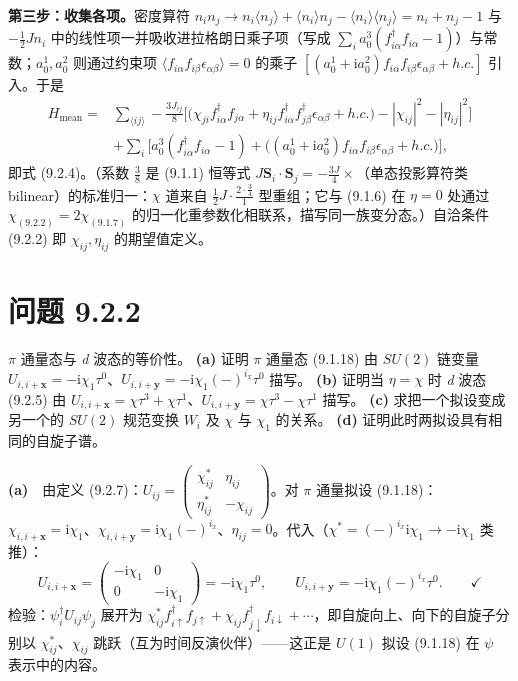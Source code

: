 \textbf{第三步：收集各项。}密度算符 $n_in_j\to n_i\langle n_j\rangle+\langle n_i\rangle n_j-\langle n_i\rangle\langle n_j\rangle=n_i+n_j-1$ 与 $-\frac12Jn_i$ 中的线性项一并吸收进拉格朗日乘子项（写成 $\sum_i a^3_0(f^{\dagger}_{i\alpha}f_{i\alpha}-1)$）与常数；$a^1_0,a^2_0$ 则通过约束项 $\langle f_{i\alpha}f_{i\beta}\epsilon_{\alpha\beta}\rangle=0$ 的乘子 $[(a^1_0+\mathrm{i}a^2_0)f_{i\alpha}f_{i\beta}\epsilon_{\alpha\beta}+h.c.]$ 引入。于是
\begin{align*}
H_{\text{mean}}={}&\sum_{\langle ij\rangle}-\frac{3J_{ij}}{8}\Big[\big(\chi_{ji}f^{\dagger}_{i\alpha}f_{j\alpha}+\eta_{ij}f^{\dagger}_{i\alpha}f^{\dagger}_{j\beta}\epsilon_{\alpha\beta}+h.c.\big)-|\chi_{ij}|^{2}-|\eta_{ij}|^{2}\Big]\\
&+\sum_i\Big[a^3_0(f^{\dagger}_{i\alpha}f_{i\alpha}-1)+\big((a^1_0+\mathrm{i}a^2_0)f_{i\alpha}f_{i\beta}\epsilon_{\alpha\beta}+h.c.\big)\Big] ,
\end{align*}
即式 (9.2.4)。（系数 $\frac38$ 是 (9.1.1) 恒等式 $J\pmb{S}_i\cdot\pmb{S}_j=-\frac{3J}{4}\times$（单态投影算符类 bilinear）的标准归一：$\chi$ 道来自 $\frac12J\cdot\frac{2\cdot\frac34}{1}$ 型重组；它与 (9.1.6) 在 $\eta=0$ 处通过 $\chi_{(9.2.2)}=2\chi_{(9.1.7)}$ 的归一化重参数化相联系，描写同一族变分态。）自洽条件 (9.2.2) 即 $\chi_{ij},\eta_{ij}$ 的期望值定义。

\section*{问题 9.2.2}
\begin{problem}
$\pi$ 通量态与 \emph{d} 波态的等价性。
\textbf{(a)} 证明 $\pi$ 通量态 (9.1.18) 由 $SU(2)$ 链变量 $U_{i,i+\pmb{x}}=-\mathrm{i}\chi_1\tau^0$、$U_{i,i+\pmb{y}}=-\mathrm{i}\chi_1(-)^{i_x}\tau^0$ 描写。
\textbf{(b)} 证明当 $\eta=\chi$ 时 \emph{d} 波态 (9.2.5) 由 $U_{i,i+\pmb{x}}=\chi\tau^3+\chi\tau^1$、$U_{i,i+\pmb{y}}=\chi\tau^3-\chi\tau^1$ 描写。
\textbf{(c)} 求把一个拟设变成另一个的 $SU(2)$ 规范变换 $W_i$ 及 $\chi$ 与 $\chi_1$ 的关系。
\textbf{(d)} 证明此时两拟设具有相同的自旋子谱。
\end{problem}
\solution
\textbf{(a)}　由定义 (9.2.7)：$U_{ij}=\begin{pmatrix}\chi^*_{ij}&\eta_{ij}\\ \eta^*_{ij}&-\chi_{ij}\end{pmatrix}$。对 $\pi$ 通量拟设 (9.1.18)：$\chi_{i,i+\pmb{x}}=\mathrm{i}\chi_1$、$\chi_{i,i+\pmb{y}}=\mathrm{i}\chi_1(-)^{i_x}$、$\eta_{ij}=0$。代入（$\chi^*=(-)^{i_x}\mathrm{i}\chi_1\to-\mathrm{i}\chi_1$ 类推）：
\begin{equation*}
U_{i,i+\pmb{x}}=\begin{pmatrix}-\mathrm{i}\chi_1&0\\0&-\mathrm{i}\chi_1\end{pmatrix}=-\mathrm{i}\chi_1\tau^{0},\qquad
U_{i,i+\pmb{y}}=-\mathrm{i}\chi_1(-)^{i_x}\tau^{0} .\qquad\checkmark
\end{equation*}
检验：$\psi^{\dagger}_iU_{ij}\psi_j$ 展开为 $\chi^*_{ij}f^{\dagger}_{i\uparrow}f_{j\uparrow}+\chi_{ij}f^{\dagger}_{j\downarrow}f_{i\downarrow}+\cdots$，即自旋向上、向下的自旋子分别以 $\chi^*_{ij}$、$\chi_{ij}$ 跳跃（互为时间反演伙伴）——这正是 $U(1)$ 拟设 (9.1.18) 在 $\psi$ 表示中的内容。

